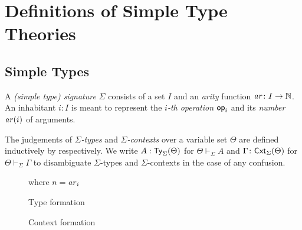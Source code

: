 \documentclass[acmsmall,screen]{acmart}
\theoremstyle{acmdefinition}
\begin{document}
\section{Definitions of Simple Type Theories}\label{sec:simple-type-theories}
\subsection{Simple Types}
\begin{definition}
  A \emph{(simple type) signature} $\Sigma$ consists of a set $I$ and an \emph{arity} function $\mathit{ar}\colon I \to \mathbb{N}$.
  An inhabitant $i : I$ is meant to represent the \emph{$i$-th operation} $\mathsf{op}_i$ and its \emph{number} $ \mathit{ar}(i)$ of arguments.

  The judgements of \emph{$\Sigma$-types} and \emph{$\Sigma$-contexts} over a variable set $\Theta$ are defined inductively by  respectively.
We write $A : \mathsf{Ty}_{\Sigma}(\Theta)$ for $\Theta \vdash_{\Sigma} A$ and $\Gamma \colon \mathsf{Cxt}_{\Sigma}(\Theta)$ for $\Theta \vdash_{\Sigma} \Gamma$ to disambiguate $\Sigma$-types and $\Sigma$-contexts in the case of any confusion.
\end{definition}

\begin{figure}
  \begin{minipage}[b]{.55\textwidth}
    \centering
    \small
    where $n = \mathit{ar}_i$
    \caption{Type formation}
    \label{fig:simple-type}
  \end{minipage}
  \begin{minipage}[b]{.4\textwidth}
    \centering
    \small
    \caption{Context formation}
  \label{fig:simple-context}
  \end{minipage}
\end{figure}
\end{document}
